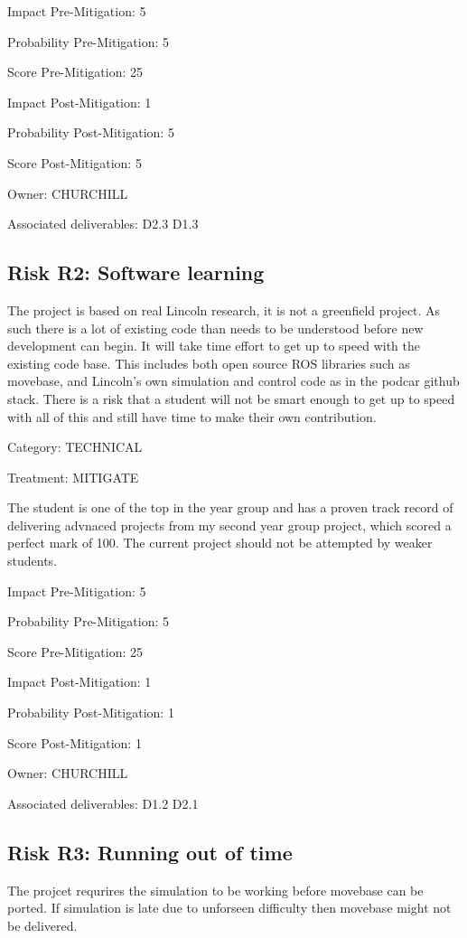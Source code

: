 \documentclass[english]{article}
\begin{document}
Impact Pre-Mitigation: 5

Probability Pre-Mitigation: 5

Score Pre-Mitigation: 25

Impact Post-Mitigation: 1

Probability Post-Mitigation: 5

Score Post-Mitigation: 5

Owner: CHURCHILL

Associated deliverables: D2.3 D1.3 

\subsection*{Risk R2: Software learning}

The project is based on real Lincoln research, it is not a greenfield project. As such there is a lot of existing code than needs to be understood before new development can begin. It will take time effort to get up to speed with the existing code base. This includes both open source ROS libraries such as movebase, and Lincoln's own simulation and control code as in the podcar github stack. There is a risk that a student will not be smart enough to get up to speed with all of this and still have time to make their own contribution.

Category: TECHNICAL

Treatment: MITIGATE

 The student is one of the top in the year group and has a proven track record of delivering advnaced projects from my second year group project, which scored a perfect mark of 100.  The current project should not be attempted by weaker students.

Impact Pre-Mitigation: 5

Probability Pre-Mitigation: 5

Score Pre-Mitigation: 25

Impact Post-Mitigation: 1

Probability Post-Mitigation: 1

Score Post-Mitigation: 1

Owner: CHURCHILL

Associated deliverables: D1.2 D2.1 

\subsection*{Risk R3: Running out of time}

The projcet requrires the simulation to be working before movebase can be ported. If simulation is late due to unforseen difficulty then movebase might not be delivered.
\end{document}
